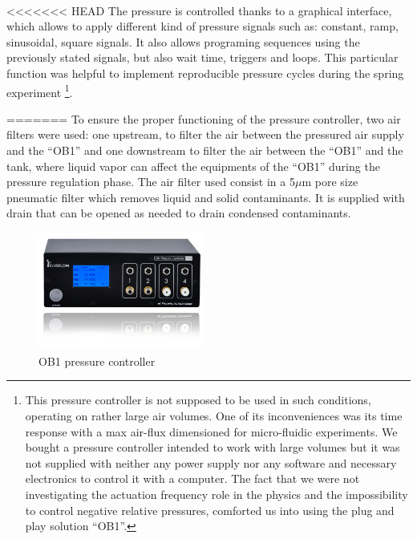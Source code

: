 \paragraph{}
<<<<<<< HEAD
The pressure is controlled thanks to a graphical interface, which allows to apply different kind of pressure signals such as: constant, ramp, sinusoidal, square signals. It also allows programing sequences using the previously stated signals, but also wait time, triggers and loops. This particular function was helpful to implement reproducible pressure cycles during the spring experiment
\footnote{
This pressure controller is not supposed to be used in such conditions, operating on rather large air volumes. One of its inconveniences was its time response with a max air-flux dimensioned for micro-fluidic experiments. We bought a pressure controller intended to work with large volumes but it was not supplied with neither any power supply nor any software and necessary electronics to control it with a computer. The fact that we were not investigating the actuation frequency role in the physics and the impossibility to control negative relative pressures, comforted us into using the plug and play solution "`OB1"'.}.


=======
To ensure the proper functioning of the pressure controller, two air filters were used: one upstream, to filter the air between the pressured air supply and the "`OB1"' and one downstream to filter the air between the "`OB1"' and the tank, where liquid vapor can affect the equipments of the "`OB1"' during the pressure regulation phase.
The air filter used consist in a 5$\mu$m pore size pneumatic filter which removes liquid and solid contaminants. It is supplied with drain that can be opened as needed to drain condensed contaminants.
\begin{figure}[H] %
	\centering%
  \includegraphics[width=0.48\textwidth]{figures/Chapter_1/OB1.png}
	\caption{OB1 pressure controller}
	\label{fig:ob1}
\end{figure}

